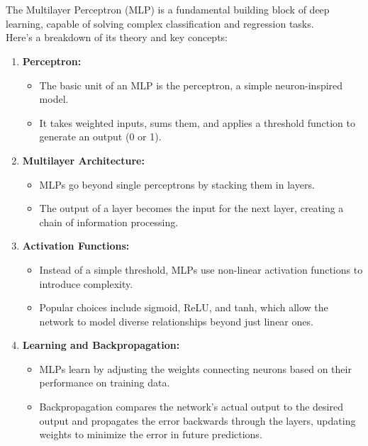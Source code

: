 \documentclass{article}
\begin{document}
   \section{}
    \begin{flushleft}
        \noindent
        \large{
        The Multilayer Perceptron (MLP) is a fundamental building block of deep learning, capable of solving complex classification and regression tasks. \\ 
        \noindent  Here's a breakdown of its theory and key concepts:}



        \begin{enumerate}
            \item \textbf{Perceptron:}
                \begin{itemize}
                    \item The basic unit of an MLP is the perceptron, a simple neuron-inspired model.
                    \item It takes weighted inputs, sums them, and applies a threshold function to generate an output (0 or 1).
                \end{itemize}
            \item \textbf{Multilayer Architecture:}
                \begin{itemize}
                    \item MLPs go beyond single perceptrons by stacking them in layers.
                    \item The output of a layer becomes the input for the next layer, creating a chain of information processing.
                \end{itemize}

            \item \textbf{Activation Functions:}
                \begin{itemize}
                    \item Instead of a simple threshold, MLPs use non-linear activation functions to introduce complexity.
                    \item Popular choices include sigmoid, ReLU, and tanh, which allow the network to model diverse relationships beyond just linear ones.
                \end{itemize}

            \item \textbf{Learning and Backpropagation:}
                \begin{itemize}
                    \item MLPs learn by adjusting the weights connecting neurons based on their performance on training data.
                    \item Backpropagation compares the network's actual output to the desired output and propagates the error backwards through the layers, updating weights to minimize the error in future predictions.
                \end{itemize}


\end{enumerate}
\end{flushleft}
\end{document}
